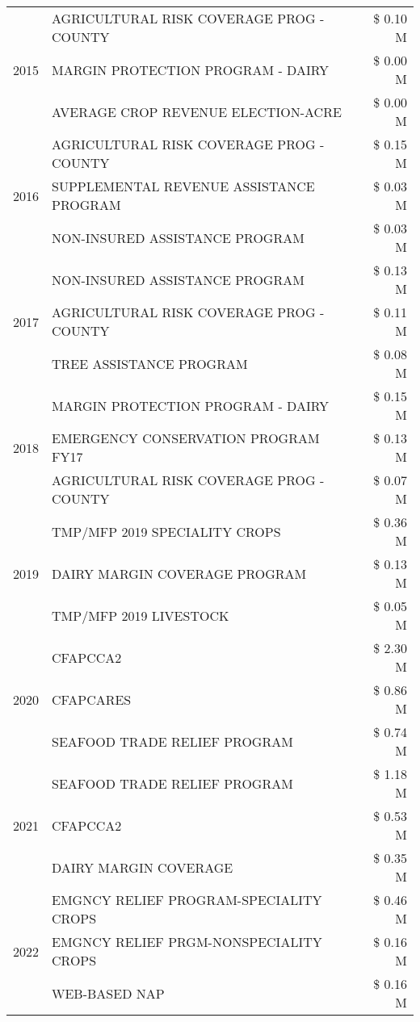 \begin{tabular}{llr}
\cline{1-3}
\multirow[t]{3}{*}{2015} & AGRICULTURAL RISK COVERAGE PROG - COUNTY & \$ 0.10 M \\
 & MARGIN PROTECTION PROGRAM - DAIRY & \$ 0.00 M \\
 & AVERAGE CROP REVENUE ELECTION-ACRE & \$ 0.00 M \\
\cline{1-3}
\multirow[t]{3}{*}{2016} & AGRICULTURAL RISK COVERAGE PROG - COUNTY & \$ 0.15 M \\
 & SUPPLEMENTAL REVENUE ASSISTANCE PROGRAM & \$ 0.03 M \\
 & NON-INSURED ASSISTANCE PROGRAM & \$ 0.03 M \\
\cline{1-3}
\multirow[t]{3}{*}{2017} & NON-INSURED ASSISTANCE PROGRAM & \$ 0.13 M \\
 & AGRICULTURAL RISK COVERAGE PROG - COUNTY & \$ 0.11 M \\
 & TREE ASSISTANCE PROGRAM & \$ 0.08 M \\
\cline{1-3}
\multirow[t]{3}{*}{2018} & MARGIN PROTECTION PROGRAM - DAIRY & \$ 0.15 M \\
 & EMERGENCY CONSERVATION PROGRAM FY17 & \$ 0.13 M \\
 & AGRICULTURAL RISK COVERAGE PROG - COUNTY & \$ 0.07 M \\
\cline{1-3}
\multirow[t]{3}{*}{2019} & TMP/MFP 2019 SPECIALITY CROPS & \$ 0.36 M \\
 & DAIRY MARGIN COVERAGE PROGRAM & \$ 0.13 M \\
 & TMP/MFP 2019 LIVESTOCK & \$ 0.05 M \\
\cline{1-3}
\multirow[t]{3}{*}{2020} & CFAPCCA2 & \$ 2.30 M \\
 & CFAPCARES & \$ 0.86 M \\
 & SEAFOOD TRADE RELIEF PROGRAM & \$ 0.74 M \\
\cline{1-3}
\multirow[t]{3}{*}{2021} & SEAFOOD TRADE RELIEF PROGRAM & \$ 1.18 M \\
 & CFAPCCA2 & \$ 0.53 M \\
 & DAIRY MARGIN COVERAGE & \$ 0.35 M \\
\cline{1-3}
\multirow[t]{3}{*}{2022} & EMGNCY RELIEF PROGRAM-SPECIALITY CROPS & \$ 0.46 M \\
 & EMGNCY RELIEF PRGM-NONSPECIALITY CROPS & \$ 0.16 M \\
 & WEB-BASED NAP & \$ 0.16 M \\
\cline{1-3}
\bottomrule
\end{tabular}
